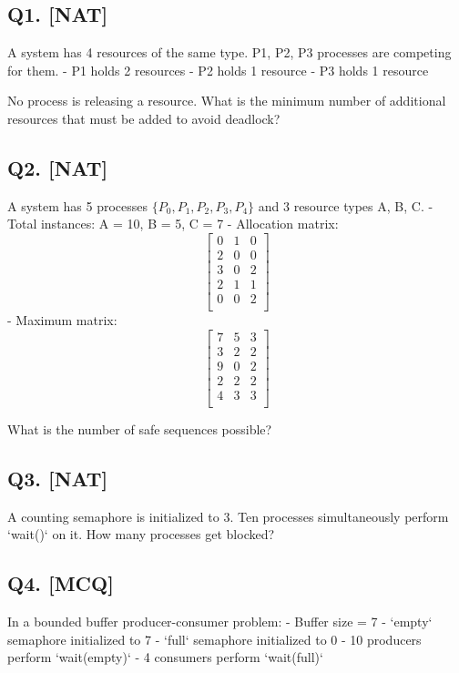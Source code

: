 \subsection*{Q1. [NAT]}
A system has 4 resources of the same type. P1, P2, P3 processes are competing for them. 
- P1 holds 2 resources
- P2 holds 1 resource
- P3 holds 1 resource

No process is releasing a resource. What is the minimum number of additional resources that must be added to avoid deadlock?

\vspace{1em}

\subsection*{Q2. [NAT]}
A system has 5 processes $\{P_0, P_1, P_2, P_3, P_4\}$ and 3 resource types A, B, C.
- Total instances: A = 10, B = 5, C = 7  
- Allocation matrix:  
\[
\begin{bmatrix}
0 & 1 & 0 \\
2 & 0 & 0 \\
3 & 0 & 2 \\
2 & 1 & 1 \\
0 & 0 & 2 \\
\end{bmatrix}
\]  
- Maximum matrix:  
\[
\begin{bmatrix}
7 & 5 & 3 \\
3 & 2 & 2 \\
9 & 0 & 2 \\
2 & 2 & 2 \\
4 & 3 & 3 \\
\end{bmatrix}
\]  

What is the number of safe sequences possible?

\vspace{1em}

\subsection*{Q3. [NAT]}
A counting semaphore is initialized to 3. Ten processes simultaneously perform `wait()` on it. How many processes get blocked?

\vspace{1em}

\subsection*{Q4. [MCQ]}
In a bounded buffer producer-consumer problem:
- Buffer size = 7
- `empty` semaphore initialized to 7
- `full` semaphore initialized to 0
- 10 producers perform `wait(empty)`
- 4 consumers perform `wait(full)`

